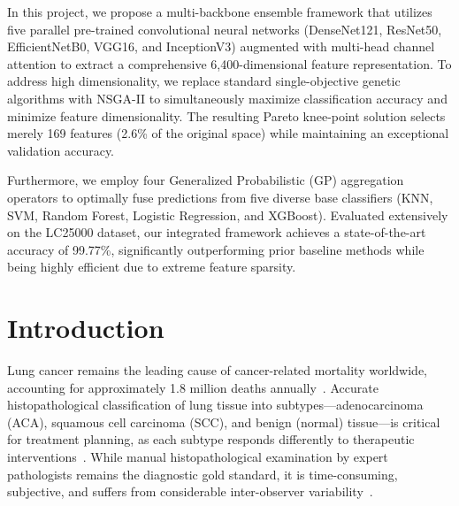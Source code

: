 \documentclass[11pt,a4paper]{article}
\begin{document}
In this project, we propose a multi-backbone ensemble framework that utilizes five parallel pre-trained convolutional neural networks (DenseNet121, ResNet50, EfficientNetB0, VGG16, and InceptionV3) augmented with multi-head channel attention to extract a comprehensive 6,400-dimensional feature representation. To address high dimensionality, we replace standard single-objective genetic algorithms with NSGA-II to simultaneously maximize classification accuracy and minimize feature dimensionality. The resulting Pareto knee-point solution selects merely 169 features (2.6\% of the original space) while maintaining an exceptional validation accuracy.

Furthermore, we employ four Generalized Probabilistic (GP) aggregation operators to optimally fuse predictions from five diverse base classifiers (KNN, SVM, Random Forest, Logistic Regression, and XGBoost). Evaluated extensively on the LC25000 dataset, our integrated framework achieves a state-of-the-art accuracy of 99.77\%, significantly outperforming prior baseline methods while being highly efficient due to extreme feature sparsity.

\newpage

\tableofcontents
\newpage

\listoffigures
{}
\newpage

\listoftables
{}
\newpage


\section{Introduction}

Lung cancer remains the leading cause of cancer-related mortality worldwide, accounting for approximately 1.8 million deaths annually~\cite{who2024cancer}. Accurate histopathological classification of lung tissue into subtypes---adenocarcinoma (ACA), squamous cell carcinoma (SCC), and benign (normal) tissue---is critical for treatment planning, as each subtype responds differently to therapeutic interventions~\cite{travis2015who}. While manual histopathological examination by expert pathologists remains the diagnostic gold standard, it is time-consuming, subjective, and suffers from considerable inter-observer variability~\cite{robbins2023pathology}.
\end{document}
